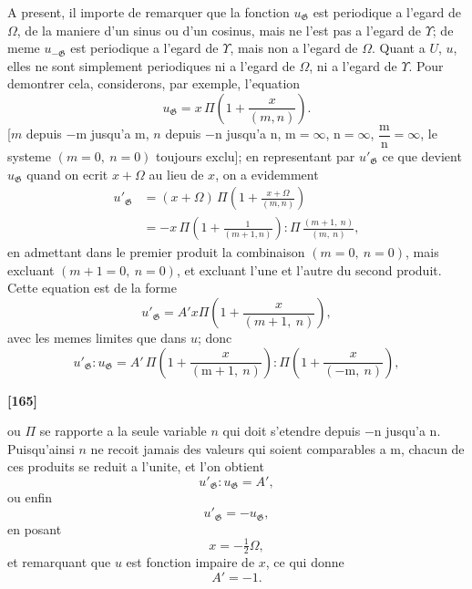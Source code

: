\documentclass[11pt,a4paper]{book}
\begin{document}
A present, il importe de remarquer que la fonction $u_{\mathfrak{G}}$ est periodique a l'egard
de $\Omega$, de la maniere d'un sinus ou d'un cosinus, mais ne l'est pas a l'egard de $\Upsilon$;
de meme $u_{-\mathfrak{G}}$ est periodique a l'egard de $\Upsilon$, mais non a l'egard de $\Omega$. Quant a $U$, $u$,
elles ne sont simplement periodiques ni a l'egard de $\Omega$, ni a l'egard de $\Upsilon$. Pour
demontrer cela, considerons, par exemple, l'equation
\begin{equation}
u_{\mathfrak{G}} = x\, \Pi \left(1 + \frac{x}{(m, n)}\right). \tag{17}
\end{equation}
[$m$ depuis $-\mathrm{m}$ jusqu'a $\mathrm{m}$, $n$ depuis $-\mathrm{n}$ jusqu'a $\mathrm{n}$, $\mathrm{m} = \infty$, $\mathrm{n} = \infty$, $\dfrac{\mathrm{m}}{\mathrm{n}} = \infty$, le systeme
$(m = 0,\ n = 0)$ toujours exclu]; en representant par $u'_{\mathfrak{G}}$ ce que devient $u_{\mathfrak{G}}$ quand on
ecrit $x + \Omega$ au lieu de $x$, on a evidemment
\begin{align*}
u'_{\mathfrak{G}} &= (x + \Omega)\, \Pi \left(1 + \frac{x + \Omega}{(m, n)}\right)\\
&= -x\, \Pi \left(1 + \frac{1}{(m+1, n)}\right) : \Pi\, \frac{(m+1,\ n)}{(m,\ n)},
\end{align*}
en admettant dans le premier produit la combinaison $(m = 0,\ n = 0)$, mais excluant
$(m+1 = 0,\ n = 0)$, et excluant l'une et l'autre du second produit. Cette equation est
de la forme
\[u'_{\mathfrak{G}} = A'x\Pi \left(1 + \frac{x}{(m+1,\ n)}\right),\]
avec les memes limites que dans $u$; donc
\[u'_{\mathfrak{G}} : u_{\mathfrak{G}} = A'\, \Pi \left(1 + \frac{x}{(\mathrm{m}+1,\ n)}\right) : \Pi \left(1 + \frac{x}{(-\mathrm{m},\ n)}\right),\]

\textbf{[165]}

ou $\Pi$ se rapporte a la seule variable $n$ qui doit s'etendre depuis $-\mathrm{n}$ jusqu'a $\mathrm{n}$.
Puisqu'ainsi $n$ ne recoit jamais des valeurs qui soient comparables a $\mathrm{m}$, chacun de
ces produits se reduit a l'unite, et l'on obtient
\[u'_{\mathfrak{G}} : u_{\mathfrak{G}} = A',\]
ou enfin
\begin{equation}
u'_{\mathfrak{G}} = -u_{\mathfrak{G}}, \tag{18}
\end{equation}
en posant
\[x = -\tfrac{1}{2}\Omega,\]
et remarquant que $u$ est fonction impaire de $x$, ce qui donne
\[A' = -1.\]
\end{document}
